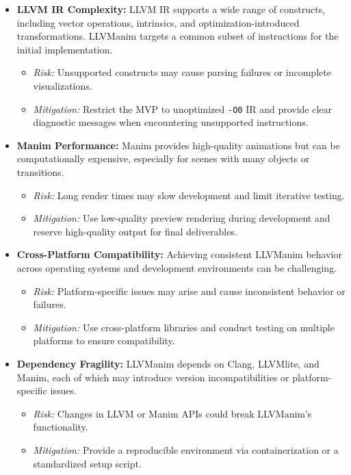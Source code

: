 \begin{itemize}
  \item \textbf{LLVM IR Complexity:} LLVM IR supports a wide range of constructs, including vector operations, intrinsics, and optimization-introduced transformations. LLVManim targets a common subset of instructions for the initial implementation.
  \begin{itemize}
    \item \textit{Risk:} Unsupported constructs may cause parsing failures or incomplete visualizations.
    \item \textit{Mitigation:} Restrict the MVP to unoptimized \texttt{-O0} IR and provide clear diagnostic messages when encountering unsupported instructions.
  \end{itemize}

  \item \textbf{Manim Performance:} Manim provides high-quality animations but can be computationally expensive, especially for scenes with many objects or transitions.
  \begin{itemize}
    \item \textit{Risk:} Long render times may slow development and limit iterative testing.
    \item \textit{Mitigation:} Use low-quality preview rendering during development and reserve high-quality output for final deliverables.
  \end{itemize}

  \item \textbf{Cross-Platform Compatibility:} Achieving consistent LLVManim behavior across operating systems and development environments can be challenging.
  \begin{itemize}
    \item \textit{Risk:} Platform-specific issues may arise and cause inconsistent behavior or failures.
    \item \textit{Mitigation:} Use cross-platform libraries and conduct testing on multiple platforms to ensure compatibility.
  \end{itemize}

  \item \textbf{Dependency Fragility:} LLVManim depends on Clang, LLVMlite, and Manim, each of which may introduce version incompatibilities or platform-specific issues.
  \begin{itemize}
    \item \textit{Risk:} Changes in LLVM or Manim APIs could break LLVManim's functionality.
    \item \textit{Mitigation:} Provide a reproducible environment via containerization or a standardized setup script.
  \end{itemize}
\end{itemize}
